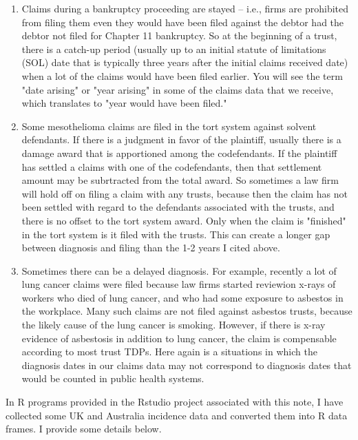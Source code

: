 \documentclass{article}\usepackage{graphicx, color}
\begin{document}
\begin{enumerate}
  \item Claims during a bankruptcy proceeding are stayed -- i.e., firms are prohibited from filing them even they would have been filed against the debtor had the debtor not filed for Chapter 11 bankruptcy.  So at the beginning of a trust, there is a catch-up period (usually up to an initial statute of limitations (SOL) date that is typically three years after the initial claims received date) when a lot of the claims would have been filed earlier.  You will see the term "date arising" or "year arising" in some of the claims data that we receive, which translates to "year would have been filed."
  \item Some mesothelioma claims are filed in the tort system against solvent defendants.  If there is a judgment in favor of the plaintiff, usually there is a damage award that is apportioned among the codefendants.  If the plaintiff has settled a claims with one of the codefendants, then that settlement amount may be subrtracted from the total award.  So sometimes a law firm will hold off on filing a claim with any trusts, because then the claim has not been settled with regard to the defendants associated with the trusts, and there is no offset to the tort system award.  Only when the claim is "finished" in the tort system is it filed with the trusts.  This can create a longer gap between diagnosis and filing than the 1-2 years I cited above.
  \item Sometimes there can be a delayed diagnosis.  For example, recently a lot of lung cancer claims were filed because law firms started reviewion x-rays of workers who died of lung cancer, and who had some exposure to asbestos in the workplace.  Many such claims are not filed against asbestos trusts, because the likely cause of the lung cancer is smoking.  However, if there is x-ray evidence of asbestosis in addition to lung cancer, the claim is compensable according to most trust TDPs.  Here again is a situations in which the diagnosis dates in our claims data may not correspond to diagnosis dates that would be counted in public health systems.
\end{enumerate}




In R programs provided in the Rstudio project associated with this note, I have collected some UK and Australia incidence data and converted them into R data frames.  I provide some details below.
\end{document}

